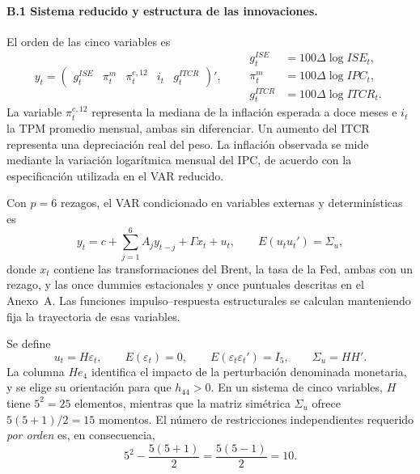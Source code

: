\documentclass[12pt,letterpaper]{article}
\begin{document}
\paragraph{B.1 Sistema reducido y estructura de las innovaciones.}
El orden de las cinco variables es
\begin{equation}
y_t=\begin{pmatrix}g_t^{ISE}&\pi_t^{m}&\pi_t^{e,12}&i_t&g_t^{ITCR}\end{pmatrix}',
\qquad
\begin{aligned}
g_t^{ISE}&=100\Delta\log ISE_t,\\
\pi_t^{m}&=100\Delta\log IPC_t,\\
g_t^{ITCR}&=100\Delta\log ITCR_t.
\end{aligned}
\label{eq:b_variables}
\end{equation}
La variable $\pi_t^{e,12}$ representa la mediana de la inflación esperada a doce meses e $i_t$ la TPM promedio mensual, ambas sin diferenciar. Un aumento del ITCR representa una depreciación real del peso. La inflación observada se mide mediante la variación logarítmica mensual del IPC, de acuerdo con la especificación utilizada en el VAR reducido.

Con $p=6$ rezagos, el VAR condicionado en variables externas y determinísticas es
\begin{equation}
y_t=c+\sum_{j=1}^{6}A_jy_{t-j}+\Gamma x_t+u_t,
\qquad E(u_tu_t')=\Sigma_u,
\label{eq:b_var}
\end{equation}
donde $x_t$ contiene las transformaciones del Brent, la tasa de la Fed, ambas con un rezago, y las once dummies estacionales y once puntuales descritas en el Anexo~A. Las funciones impulso--respuesta estructurales se calculan manteniendo fija la trayectoria de esas variables.

Se define
\begin{equation}
u_t=H\varepsilon_t,\qquad
E(\varepsilon_t)=0,\qquad E(\varepsilon_t\varepsilon_t')=I_5,
\qquad \Sigma_u=HH'.
\label{eq:b_cov}
\end{equation}
La columna $He_4$ identifica el impacto de la perturbación denominada monetaria, y se elige su orientación para que $h_{44}>0$. En un sistema de cinco variables, $H$ tiene $5^2=25$ elementos, mientras que la matriz simétrica $\Sigma_u$ ofrece $5(5+1)/2=15$ momentos. El número de restricciones independientes requerido \emph{por orden} es, en consecuencia,
\begin{equation}
5^2-\frac{5(5+1)}2=\frac{5(5-1)}2=10.
\label{eq:b_conteo}
\end{equation}
\end{document}
